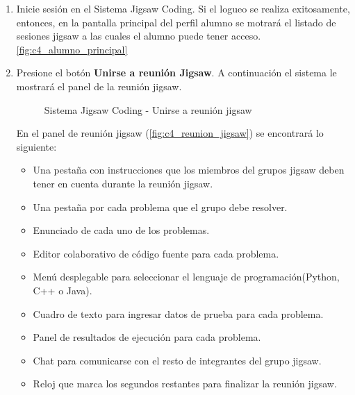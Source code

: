 \begin{enumerate}
	\item Inicie sesión en el Sistema Jigsaw Coding. Si el logueo se realiza exitosamente, entonces, en la pantalla principal del perfil alumno se motrará el listado de sesiones jigsaw a las cuales el alumno puede tener acceso.\autoref{fig:c4_alumno_principal}
	\item Presione el botón \textbf{Unirse a reunión Jigsaw}. A continuación el sistema le mostrará el panel de la reunión jigsaw. 
	
	\begin{figure}
		\centering
		\caption{Sistema Jigsaw Coding - Unirse a reunión jigsaw}
		\label{fig:c4_reunion_jigsaw}
	\end{figure}
	
	En el panel de reunión jigsaw  (\autoref{fig:c4_reunion_jigsaw}) se encontrará lo siguiente: 
	
	\begin{itemize}
		\item Una pestaña con instrucciones que los miembros del grupos jigsaw deben tener en cuenta durante la reunión jigsaw.
		\item Una pestaña por cada problema que el grupo debe resolver.
		\item Enunciado de cada uno de los problemas.
		\item Editor colaborativo de código fuente para cada problema.
		\item Menú desplegable para seleccionar el lenguaje de programación(Python, C++ o Java).
		\item Cuadro de texto para ingresar datos de prueba para cada problema.
		\item Panel de resultados de ejecución para cada problema.
		\item Chat para comunicarse con el resto de integrantes del grupo jigsaw.
		\item Reloj que marca los segundos restantes para finalizar la reunión jigsaw.
	\end{itemize}
\end{enumerate}

